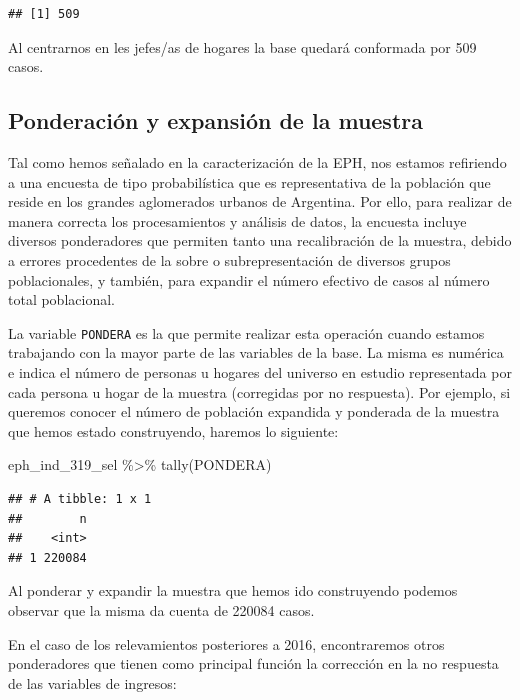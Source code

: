 \documentclass[
]{book}
\newenvironment{Shaded}{\begin{snugshade}}{\end{snugshade}}
\newcommand{\FunctionTok}[1]{\textcolor[rgb]{0.00,0.00,0.00}{#1}}
\newcommand{\NormalTok}[1]{#1}
\newcommand{\SpecialCharTok}[1]{\textcolor[rgb]{0.00,0.00,0.00}{#1}}
\begin{document}
\begin{verbatim}
## [1] 509
\end{verbatim}

Al centrarnos en les jefes/as de hogares la base quedará conformada por 509 casos.

\hypertarget{ponderaciuxf3n-y-expansiuxf3n-de-la-muestra}{%
\subsection{Ponderación y expansión de la muestra}\label{ponderaciuxf3n-y-expansiuxf3n-de-la-muestra}}

Tal como hemos señalado en la caracterización de la EPH, nos estamos refiriendo a una encuesta de tipo probabilística que es representativa de la población que reside en los grandes aglomerados urbanos de Argentina. Por ello, para realizar de manera correcta los procesamientos y análisis de datos, la encuesta incluye diversos ponderadores que permiten tanto una recalibración de la muestra, debido a errores procedentes de la sobre o subrepresentación de diversos grupos poblacionales, y también, para expandir el número efectivo de casos al número total poblacional.

La variable \texttt{PONDERA} es la que permite realizar esta operación cuando estamos trabajando con la mayor parte de las variables de la base. La misma es numérica e indica el número de personas u hogares del universo en estudio representada por cada persona u hogar de la muestra (corregidas por no respuesta). Por ejemplo, si queremos conocer el número de población expandida y ponderada de la muestra que hemos estado construyendo, haremos lo siguiente:

\begin{Shaded}
\begin{Highlighting}[]
\NormalTok{eph\_ind\_319\_sel }\SpecialCharTok{\%\textgreater{}\%} 
    \FunctionTok{tally}\NormalTok{(PONDERA)}
\end{Highlighting}
\end{Shaded}

\begin{verbatim}
## # A tibble: 1 x 1
##        n
##    <int>
## 1 220084
\end{verbatim}

Al ponderar y expandir la muestra que hemos ido construyendo podemos observar que la misma da cuenta de 220084 casos.

En el caso de los relevamientos posteriores a 2016, encontraremos otros ponderadores que tienen como principal función la corrección en la no respuesta de las variables de ingresos:
\end{document}
